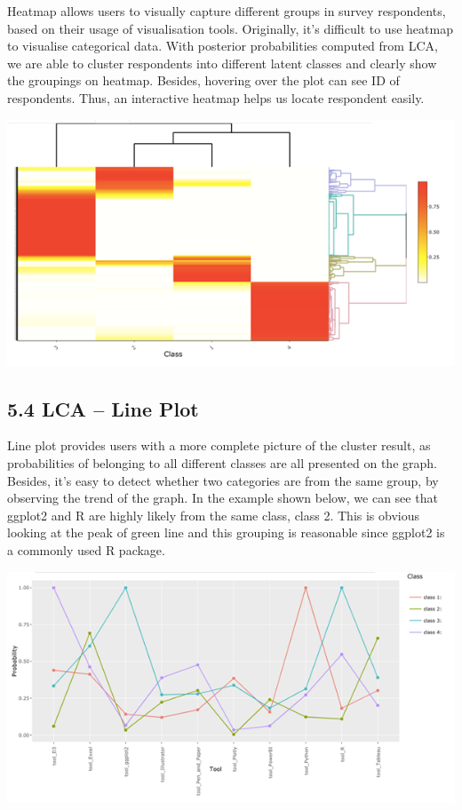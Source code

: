 \documentclass{acm_proc_article-sp}
\begin{document}
Heatmap allows users to visually capture different groups in survey
respondents, based on their usage of visualisation tools. Originally,
it's difficult to use heatmap to visualise categorical data. With
posterior probabilities computed from LCA, we are able to cluster
respondents into different latent classes and clearly show the groupings
on heatmap. Besides, hovering over the plot can see ID of respondents.
Thus, an interactive heatmap helps us locate respondent easily.

\begin{center}\includegraphics[width=1\linewidth]{11} \end{center}

\hypertarget{lca-line-plot}{%
\subsection{5.4 LCA -- Line Plot}\label{lca-line-plot}}

Line plot provides users with a more complete picture of the cluster
result, as probabilities of belonging to all different classes are all
presented on the graph. Besides, it's easy to detect whether two
categories are from the same group, by observing the trend of the graph.
In the example shown below, we can see that ggplot2 and R are highly
likely from the same class, class 2. This is obvious looking at the peak
of green line and this grouping is reasonable since ggplot2 is a
commonly used R package.

\begin{center}\includegraphics[width=1\linewidth]{12} \end{center}
\end{document}
